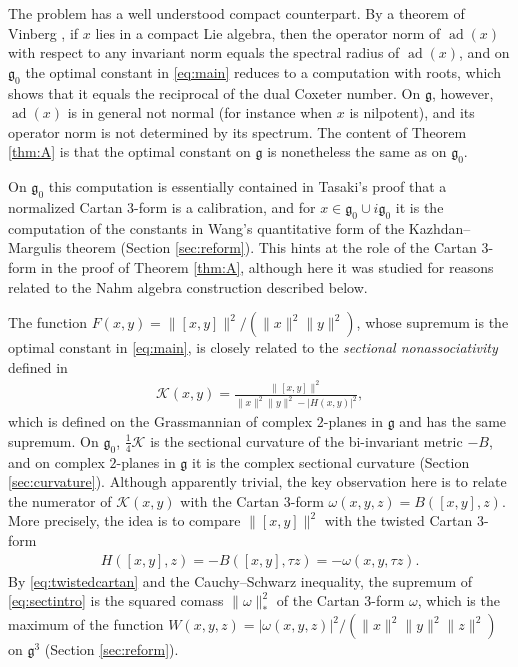 \documentclass[leqno,10pt]{amsart}
\theoremstyle{definition}
\numberwithin{equation}{section}
\newcommand{\sect}{\mathscr{K}}
\newcommand{\om}{\omega}
\newcommand{\g}{\mathfrak{g}}
\newcommand{\ad}{\operatorname{ad}}
\newcommand{\gz}{\g_{0}}
\newcommand{\norm}[1]{\lVert #1\rVert}
\newcommand{\comass}[1]{\lVert #1\rVert_{\ast}}%
\begin{document}
The problem has a well understood compact counterpart. By a theorem of Vinberg \cite{Vinberg-invariantnorms}, if $x$ lies in a compact Lie algebra, then the operator norm of $\ad(x)$ with respect to any invariant norm equals the spectral radius of $\ad(x)$, and on $\gz$ the optimal constant in \eqref{eq:main} reduces to a computation with roots, which shows that it equals the reciprocal of the dual Coxeter number. On $\g$, however, $\ad(x)$ is in general not normal (for instance when $x$ is nilpotent), and its operator norm is not determined by its spectrum. The content of Theorem \ref{thm:A} is that the optimal constant on $\g$ is nonetheless the same as on $\gz$. 

On $\gz$ this computation is essentially contained in Tasaki's proof \cite{Tasaki-calibration} that a normalized Cartan $3$-form is a calibration, and for $x \in \gz \cup i\gz$ it is the computation of the constants in Wang's quantitative form of the Kazhdan--Margulis theorem \cite{Wang-nilpotent, Adeboye-Wang-Wei} (Section \ref{sec:reform}). This hints at the role of the Cartan $3$-form in the proof of Theorem \ref{thm:A}, although here it was studied for reasons related to the Nahm algebra construction described below.

The function $F(x, y) = \norm{[x, y]}^{2}/(\norm{x}^{2}\norm{y}^{2})$, whose supremum is the optimal constant in \eqref{eq:main}, is closely related to the \emph{sectional nonassociativity} defined in \cite{Fox-sectna}
\begin{align}\label{eq:sectintro}
\sect(x, y) = \frac{\norm{[x, y]}^{2}}{\norm{x}^{2}\norm{y}^{2} - |H(x, y)|^{2}},
\end{align}
which is defined on the Grassmannian of complex $2$-planes in $\g$ and has the same supremum. On $\gz$, $\tfrac{1}{4}\sect$ is the sectional curvature of the bi-invariant metric $-B$, and on complex $2$-planes in $\g$ it is the complex sectional curvature (Section \ref{sec:curvature}). Although apparently trivial, the key observation here is to relate the numerator of $\sect(x, y)$ with the Cartan $3$-form $\om(x, y, z) = B([x, y], z)$. More precisely, the idea is to compare $\norm{[x, y]}^2$ with the twisted Cartan $3$-form 
\begin{align}\label{eq:twistedcartan}
H([x, y], z) = -B([x, y], \tau z) = -\om(x, y, \tau z).
\end{align}
By \eqref{eq:twistedcartan} and the Cauchy--Schwarz inequality, the supremum of \eqref{eq:sectintro} is the squared comass $\comass{\om}^{2}$ of the Cartan $3$-form $\om$, which is the maximum of the function $W(x, y, z) = |\om(x, y, z)|^{2}/(\norm{x}^{2}\norm{y}^{2}\norm{z}^{2})$ on $\g^{3}$ (Section \ref{sec:reform}). 
\end{document}
